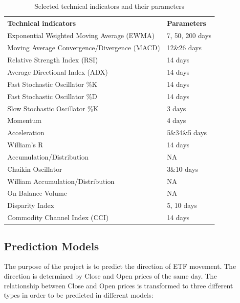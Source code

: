 \documentclass[letterpaper]{article}
\begin{document}
 \begin{table}
   \centering
   \caption{Selected technical indicators and their parameters}
   \label{technicalIndicators}
    \begin{tabular}{ll}
      \hline
      Technical indicators                         & Parameters     \\
      \hline
      Exponential Weighted Moving Average (EWMA)   & 7, 50, 200 days \\
      Moving Average Convergence/Divergence (MACD) & 12\&26 days     \\
      Relative Strength Index (RSI)                & 14 days         \\
      Average Directional Index (ADX)              & 14 days         \\
      Fast Stochastic Oscillator \%K               & 14 days         \\
      Fast Stochastic Oscillator \%D               & 14 days         \\
      Slow Stochastic Oscillator \%K               & 3 days          \\
      Momentum                                     & 4 days          \\
      Acceleration                                 & 5\&34\&5 days   \\
      William's R                                  & 14 days         \\
      Accumulation/Distribution                    & NA              \\
      Chaikin Oscillator                           & 3\&10 days      \\
      William Accumulation/Distribution            & NA              \\
      On Balance Volume                            & NA              \\
      Disparity Index                              & 5, 10 days      \\
      Commodity Channel Index (CCI)                & 14 days         \\
      \hline
    \end{tabular}
\end{table}

\subsection{Prediction Models}
The purpose of the project is to predict the direction of ETF movement. The
direction is determined by Close and Open prices of the same day.
The relationship between Close and Open prices is transformed to three
different types in order to be predicted in different models:
\end{document}
